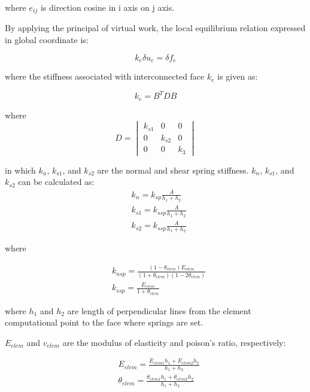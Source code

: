where $e_{ij}$ is direction cosine in i axis on j axis.

By applying the principal of virtual work, the local equilibrium relation expressed in global coordinate is:

\begin{equation}
  k_e \delta u_e = \delta f_e
\end{equation}

where the stiffness associated with interconnected face $k_e$ is given as:

\begin{equation}
  k_e = B^T DB
\end{equation}

where
\begin{equation}
  D = \begin{vmatrix}
        k_{s1} &0 &0 \\
        0 &k_{s2} &0 \\
        0 &0 &k_3
      \end{vmatrix}
\end{equation}

in which $k_n$, $k_{s1}$, and $k_{s2}$ are the normal and shear spring stiffness. $k_n$, $k_{s1}$, and $k_{s2}$ can be calculated as:
\begin{equation}
  \begin{aligned}
    &k_n = k_{sp} \frac{A}{h_1 + h_2} \\
    &k_{s1} = k_{ssp} \frac{A}{h_1 + h_2} \\
    &k_{s2} = k_{ssp} \frac{A}{h_1 + h_2}
  \end{aligned}
\end{equation}

where

\begin{equation}
  \begin{aligned}
    &k_{nsp} = \frac{(1-\theta_{elem})E_{elem}}{(1+\theta_{elem})(1-2\theta_{elem})} \\
    &k_{ssp} = \frac{E_{elem}}{1+\theta_{elem}}
  \end{aligned}
\end{equation}

where $h_1$ and $h_2$ are length of perpendicular lines from the element computational point to the face where springs are set.

$E_{elem}$ and $v_{elem}$ are the modulus of elasticity and poison's ratio, respectively:

\begin{equation}
  \begin{aligned}
    &E_{elem} = \frac{E_{elem1} h_1 + {E_{elem2} h_2}}{h_1+h_2} \\
    &\theta_{elem} = \frac{\theta_{elem1} h_1 + {\theta_{elem2} h_2}}{h_1+h_2}
  \end{aligned}
\end{equation}

